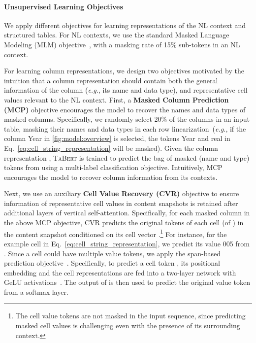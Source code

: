\documentclass[11pt,a4paper]{article}
\def\model/{\textsc{TaBert}}
\renewcommand{\tt}[1]{\fontfamily{cmtt}\selectfont #1}
\newcommand{\eg}{\hbox{\emph{e.g.}}\xspace}
\begin{document}
\paragraph{Unsupervised Learning Objectives} 
We apply different objectives for learning representations of the NL context and structured tables.
For NL contexts, we use the standard Masked Language Modeling (MLM) objective~\cite{Devlin2019BERTPO}, with a masking rate of 15\% sub-tokens in an NL context.

For learning column representations, we design two objectives motivated by the intuition that a column representation should contain both the general information of the column (\eg, its name and data type), and representative cell values relevant to the NL context.
First, 
a \textbf{Masked Column Prediction (MCP)} objective encourages the model to recover the names and data types of masked columns.
Specifically, we randomly select 20\% of the columns in an input table, masking their names and data types in each row linearization~(\eg, if the column {\tt Year} in \autoref{fig:model:overview} is selected, the tokens {\tt Year} and {\tt real} in Eq.~\eqref{eq:cell_string_representation} will be masked).
Given the column representation , \model/ is trained to predict the bag of masked (name and type) tokens from  using a multi-label classification objective.
Intuitively, MCP encourages the model to recover column information from its contexts.


Next, we use an auxiliary \textbf{Cell Value Recovery (CVR)} objective
to ensure information of representative cell values in content snapshots is retained after additional layers of vertical self-attention. 
Specifically, for each masked column  in the above MCP objective, CVR predicts the original tokens of each cell  (of ) 
in the content snapshot
conditioned on its cell vector .\footnote{The cell value tokens are not masked in the input sequence, since predicting masked cell values is challenging even with the presence of its surrounding context. }
For instance, for the example cell  in Eq.~\eqref{eq:cell_string_representation}, we predict its value {\tt 2005} from .
Since a cell could have multiple value tokens, we apply the span-based prediction objective~\cite{Joshi2019SpanBERTIP}. 
Specifically, to predict a cell token , its positional embedding  and the cell representations  are fed into a two-layer network  with GeLU activations~\cite{Hendrycks2016GaussianEL}.
The output of  is then used to predict the original value token  from a softmax layer.
\end{document}
